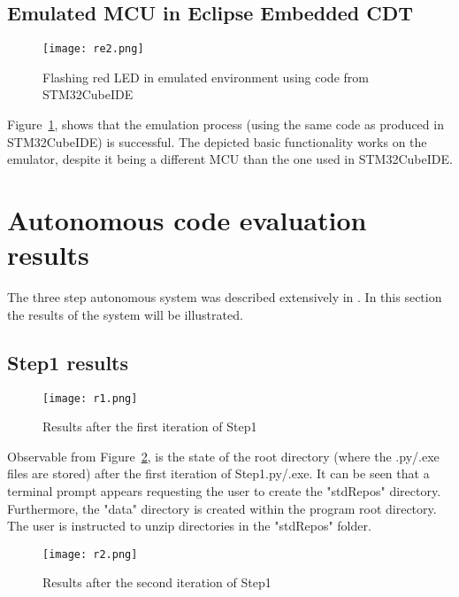 \subsection{Emulated MCU in Eclipse Embedded CDT}
\label{real}

\begin{figure}[H]
\begin{center}
\texttt{[image: re2.png]}
\caption{Flashing red LED in emulated environment using code from STM32CubeIDE}
\label{re2}
\end{center}
\end{figure}

Figure~\ref{re2}, shows that the emulation process (using the same code as produced in STM32CubeIDE) is successful. The depicted basic functionality works on the emulator, despite it being a different MCU than the one used in STM32CubeIDE.

\section{Autonomous code evaluation results} 
\label{codRes}

The three step autonomous system was described extensively in \textbf{}. In this section the results of the system will be illustrated.

\subsection{Step1 results}
\label{1res}

\begin{figure}[H]
\begin{center}
\texttt{[image: r1.png]}
\caption{Results after the first iteration of Step1}
\label{r1}
\end{center}
\end{figure}

Observable from Figure~\ref{r1}, is the state of the root directory (where the .py/.exe files are stored) after the first iteration of Step1.py/.exe. It can be seen that a terminal prompt appears requesting the user to create the "stdRepos" directory. Furthermore, the "data" directory is created within the program root directory. The user is instructed to unzip directories in the "stdRepos" folder.

\begin{figure}[H]
\begin{center}
\texttt{[image: r2.png]}
\caption{Results after the second iteration of Step1}
\label{r2}
\end{center}
\end{figure}


